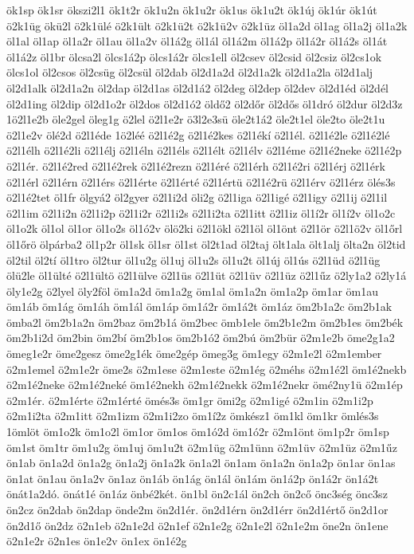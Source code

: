 {ök1sp
ök1sr
ökszi2l1
ök1t2r
ök1u2n
ök1u2r
ök1us
ök1u2t
ök1új
ök1úr
ök1út
ö2k1üg
ökü2l
ö2k1ülé
ö2k1ült
ö2k1ü2t
ö2k1ü2v
ö2k1üz
öl1a2d
öl1ag
öl1a2j
öl1a2k
öl1al
öl1ap
öl1a2r
öl1au
öl1a2v
öl1á2g
öl1ál
öl1á2m
öl1á2p
öl1á2r
öl1á2s
öl1át
öl1á2z
öl1br
ölcsa2l
ölcs1á2p
ölcs1á2r
ölcs1ell
öl2csev
öl2csid
öl2csiz
öl2cs1ok
ölcs1ol
öl2csos
öl2csüg
öl2csül
öl2dab
öl2d1a2d
öl2d1a2k
öl2d1a2la
öl2d1alj
öl2d1alk
öl2d1a2n
öl2dap
öl2d1as
öl2d1á2
öl2deg
öl2dep
öl2dev
öl2d1éd
öl2dél
öl2d1ing
öl2dip
öl2d1o2r
öl2dos
öl2d1ó2
öldő2
öl2dőr
öl2dős
öl1dró
öl2dur
öl2d3z
1ö2l1e2b
öle2gel
öleg1g
ö2lel
ö2l1e2r
ö3l2e3sü
öle2t1á2
öle2t1el
öle2to
öle2t1u
ö2l1e2v
ölé2d
ö2l1éde
1ö2léé
ö2l1é2g
ö2l1é2kes
ö2l1ékí
ö2l1él.
ö2l1é2le
ö2l1é2lé
ö2l1élh
ö2l1é2li
ö2l1élj
ö2l1éln
ö2l1éls
ö2l1élt
ö2l1élv
ö2l1éme
ö2l1é2neke
ö2l1é2p
ö2l1ér.
ö2l1é2red
ö2l1é2rek
ö2l1é2rezn
ö2l1éré
ö2l1érh
ö2l1é2ri
ö2l1érj
ö2l1érk
ö2l1érl
ö2l1érn
ö2l1érs
ö2l1érte
ö2l1érté
ö2l1értü
ö2l1é2rü
ö2l1érv
ö2l1érz
ölés3s
ö2l1é2tet
öl1fr
ölgyá2
öl2gyer
ö2l1i2d
öli2g
ö2l1iga
ö2l1igé
ö2l1igy
ö2l1ij
ö2l1il
ö2l1im
ö2l1i2n
ö2l1i2p
ö2l1i2r
ö2l1i2s
ö2l1i2ta
ö2l1itt
ö2l1iz
öl1í2r
öl1í2v
öl1o2c
öl1o2k
öl1ol
öl1or
öl1o2s
öl1ó2v
ölö2ki
ö2l1ökl
ö2l1öl
öl1önt
ö2l1ör
ö2l1ö2v
öl1őrl
öl1őrö
ölpárba2
öl1p2r
öl1sk
öl1sr
öl1st
öl2t1ad
öl2taj
ölt1ala
ölt1alj
ölta2n
öl2tid
öl2til
öl2tí
öl1tro
öl2tur
öl1u2g
öl1uj
öl1u2s
öl1u2t
öl1új
öl1ús
ö2l1üd
ö2l1üg
ölü2le
öl1ülté
ö2l1ültö
ö2l1ülve
ö2l1üs
ö2l1üt
ö2l1üv
ö2l1üz
ö2l1űz
ö2ly1a2
ö2ly1á
öly1e2g
ö2lyel
öly2föl
öm1a2d
öm1a2g
öm1al
öm1a2n
öm1a2p
öm1ar
öm1au
öm1áb
öm1ág
öm1áh
öm1ál
öm1áp
öm1á2r
öm1á2t
öm1áz
öm2b1a2c
öm2b1ak
ömba2l
öm2b1a2n
öm2baz
öm2b1á
öm2bec
ömb1ele
öm2b1e2m
öm2b1es
öm2bék
öm2b1i2d
öm2bin
öm2bí
öm2b1os
öm2b1ó2
öm2bú
öm2bür
ö2m1e2b
öme2g1a2
ömeg1e2r
öme2gesz
öme2g1ék
öme2gép
ömeg3g
öm1egy
ö2m1e2l
ö2m1ember
ö2m1emel
ö2m1e2r
öme2s
ö2m1ese
ö2m1este
ö2m1ég
ö2méhs
ö2m1é2l
öm1é2nekb
ö2m1é2neke
ö2m1é2neké
öm1é2nekh
ö2m1é2nekk
ö2m1é2nekr
ömé2ny1ü
ö2m1ép
ö2m1ér.
ö2m1érte
ö2m1érté
ömés3s
öm1gr
ömi2g
ö2m1igé
ö2m1in
ö2m1i2p
ö2m1i2ta
ö2m1itt
ö2m1izm
ö2m1i2zo
öm1í2z
ömkész1
öm1kl
öm1kr
ömlés3s
1ömlöt
öm1o2k
öm1o2l
öm1or
öm1os
öm1ó2d
öm1ó2r
ö2m1önt
öm1p2r
öm1sp
öm1st
öm1tr
öm1u2g
öm1uj
öm1u2t
ö2m1üg
ö2m1ünn
ö2m1üv
ö2m1üz
ö2m1űz
ön1ab
ön1a2d
ön1a2g
ön1a2j
ön1a2k
ön1a2l
ön1am
ön1a2n
ön1a2p
ön1ar
ön1as
ön1at
ön1au
ön1a2v
ön1az
ön1áb
ön1ág
ön1ál
ön1ám
ön1á2p
ön1á2r
ön1á2t
önát1a2dó.
önát1é
ön1áz
önbé2két.
ön1bl
ön2c1ál
ön2ch
ön2cő
önc3ség
önc3sz
ön2cz
ön2dab
ön2dap
önde2m
ön2d1ér.
ön2d1érn
ön2d1érr
ön2d1értő
ön2d1or
ön2d1ő
ön2dz
ö2n1eb
ö2n1e2d
ö2n1ef
ö2n1e2g
ö2n1e2l
ö2n1e2m
öne2n
ön1ene
ö2n1e2r
ö2n1es
ön1e2v
ön1ex
ön1é2g
}
